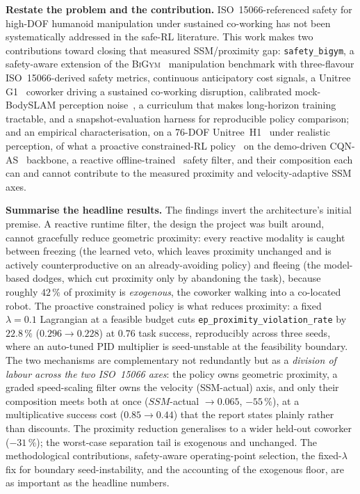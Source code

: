 \documentclass[11pt,a4paper]{report}
\newcommand{\ssm}{SSM}
\newcommand{\iso}{ISO~15066}
\newcommand{\bigym}{\textsc{BiGym}}
\newcommand{\sbigym}{\texttt{safety\_bigym}}
\newcommand{\cqnas}{CQN-AS}
\newcommand{\bodyslampp}{BodySLAM\nolinebreak[4]\hspace{-.05em}\raisebox{.2ex}{\scriptsize ++}}
\begin{document}
\iffalse
\noindent
\textbf{Restate the problem and the contribution.}
\iso{}-referenced safety for high-DOF humanoid manipulation under
sustained co-working has not been systematically addressed in the
safe-RL literature. This work makes two contributions toward
closing that measured \ssm{}/proximity gap: \sbigym{}, a safety-aware extension of the
\bigym{}~\cite{chernyadev2024bigym} manipulation benchmark with
three-flavour \iso{}-derived safety metrics, continuous
anticipatory cost signals, a Unitree G1~\cite{unitree_g1} coworker
driving a sustained co-working disruption, calibrated mock-\bodyslampp{}
perception noise~\cite{henning2023bodyslampp}, a curriculum that
makes long-horizon training tractable, and a snapshot-evaluation
harness for reproducible policy comparison; and an empirical
characterisation, on a 76-DOF Unitree~H1~\cite{unitree_h1} under
realistic perception, of what a proactive constrained-RL
policy~\cite{stooke2020pid} on the demo-driven
\cqnas{}~\cite{seo2024cqnas} backbone, a reactive
offline-trained~\cite{kumar2020cql} safety filter, and their
composition each can and cannot contribute to the measured proximity
and velocity-adaptive \ssm{} axes.

\noindent
\textbf{Summarise the headline results.}
The findings invert the architecture's initial premise. A reactive
runtime filter, the design the project was built around, cannot
gracefully reduce geometric proximity: every reactive modality is
caught between freezing (the learned veto, which leaves proximity
unchanged and is actively counterproductive on an already-avoiding
policy) and fleeing (the model-based dodges, which cut proximity only
by abandoning the task), because roughly $42\,\%$ of proximity is
\emph{exogenous}, the coworker walking into a co-located robot. The
proactive constrained policy is what reduces proximity: a fixed
$\lambda = 0.1$ Lagrangian at a feasible budget cuts
\texttt{ep\_proximity\_violation\_rate} by $22.8\,\%$
($0.296 \rightarrow 0.228$) at $0.76$ task success, reproducibly
across three seeds, where an auto-tuned PID multiplier is seed-unstable
at the feasibility boundary. The two mechanisms are complementary not
redundantly but as a \emph{division of labour across the two \iso{}
axes}: the policy owns geometric proximity, a graded speed-scaling
filter owns the velocity (\ssm{}-actual) axis, and only their
composition meets both at once ($\ssm{}$-actual $\rightarrow 0.065$,
$-55\,\%$), at a multiplicative success cost ($0.85 \rightarrow 0.44$)
that the report states plainly rather than discounts. The proximity
reduction generalises to a wider held-out coworker
($-31\,\%$); the worst-case separation tail is exogenous and
unchanged. The methodological contributions, safety-aware operating-point
selection, the fixed-$\lambda$ fix for boundary seed-instability, and
the accounting of the exogenous floor, are as important as the headline
numbers.
\end{document}
